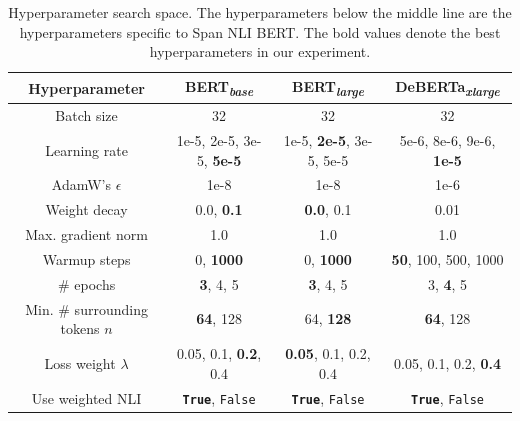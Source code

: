 \begin{table}[t]
    \centering
    \fontsize{8pt}{10pt}\selectfont
    \renewcommand{\arraystretch}{1.0}
    \begin{tabular}{cccc}\toprule
        Hyperparameter & BERT\textsubscript{\textit{base}} & BERT\textsubscript{\textit{large}} & DeBERTa\textsubscript{\textit{xlarge}} \\\midrule
        Batch size & 32 & 32 & 32  \\
        Learning rate & 1e-5, 2e-5, 3e-5, \textbf{5e-5}  & 1e-5, \textbf{2e-5}, 3e-5, 5e-5 & 5e-6, 8e-6, 9e-6, \textbf{1e-5}  \\
        AdamW's $\epsilon$ & 1e-8 & 1e-8 & 1e-6  \\
        Weight decay & 0.0, \textbf{0.1} & \textbf{0.0}, 0.1 & 0.01  \\
        Max. gradient norm & 1.0 & 1.0 & 1.0  \\
        Warmup steps & 0, \textbf{1000} & 0, \textbf{1000} & \textbf{50}, 100, 500, 1000  \\
        \# epochs & \textbf{3}, 4, 5 & \textbf{3}, 4, 5 & 3, \textbf{4}, 5  \\\midrule
        Min. \# surrounding tokens $n$ & \textbf{64}, 128 & 64, \textbf{128} & \textbf{64}, 128 \\
        Loss weight $\lambda$ & 0.05, 0.1, \textbf{0.2}, 0.4 & \textbf{0.05}, 0.1, 0.2, 0.4 & 0.05, 0.1, 0.2, \textbf{0.4} \\
        Use weighted NLI & \textbf{\texttt{True}}, \texttt{False} & \textbf{\texttt{True}}, \texttt{False} & \textbf{\texttt{True}}, \texttt{False} \\
        \bottomrule
    \end{tabular}
    \caption{Hyperparameter search space. The hyperparameters below the middle line are the hyperparameters specific to Span NLI BERT. The bold values denote the best hyperparameters in our experiment.}\label{tab:hyperparameters}
\end{table}
